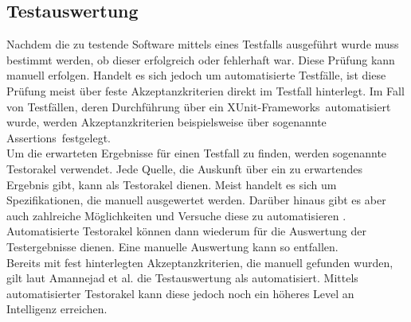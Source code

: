 \subsection{Testauswertung}
\label{subsec:testauswertung}
Nachdem die zu testende Software mittels eines Testfalls ausgeführt wurde muss bestimmt werden, ob dieser erfolgreich oder fehlerhaft war. Diese Prüfung kann manuell erfolgen. Handelt es sich jedoch um automatisierte Testfälle, ist diese Prüfung meist über feste Akzeptanzkriterien direkt im Testfall hinterlegt. Im Fall von Testfällen, deren Durchführung über ein \grq XUnit-Frameworks\grq\ automatisiert wurde, werden Akzeptanzkriterien beispielsweise über sogenannte \grq Assertions\grq\ festgelegt.\\
Um die erwarteten Ergebnisse für einen Testfall zu finden, werden sogenannte Testorakel verwendet.
Jede Quelle, die Auskunft über ein zu erwartendes Ergebnis gibt, kann als Testorakel dienen.
Meist handelt es sich um Spezifikationen, die manuell ausgewertet werden.
Darüber hinaus gibt es aber auch zahlreiche Möglichkeiten und Versuche diese zu automatisieren \cite{memon_automated_2000} \cite{richardson_specification-based_1992} \cite{shahamiri_comparative_2009}.
Automatisierte Testorakel können dann wiederum für die Auswertung der Testergebnisse dienen. Eine manuelle Auswertung kann so entfallen.\\
Bereits mit fest hinterlegten Akzeptanzkriterien, die manuell gefunden wurden, gilt laut Amannejad et al. \cite{amannejad_search-based_2014} die Testauswertung als automatisiert. Mittels automatisierter Testorakel kann diese jedoch noch ein höheres Level an Intelligenz erreichen. 




